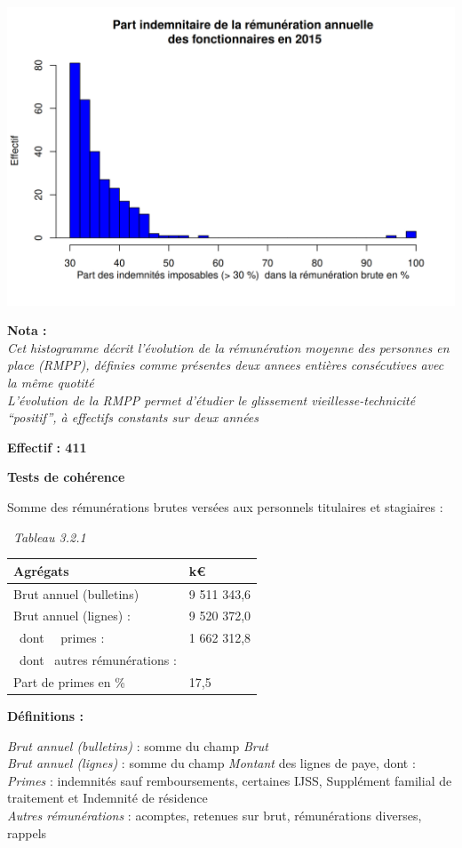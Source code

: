 \includegraphics{altair_files/figure-latex/unnamed-chunk-76-6.png}

\textbf{Nota :}\\
\emph{Cet histogramme décrit l'évolution de la rémunération moyenne des
personnes en place (RMPP), définies comme présentes deux annees entières
consécutives avec la même quotité}\\
\emph{L'évolution de la RMPP permet d'étudier le glissement
vieillesse-technicité ``positif'', à effectifs constants sur deux
années}

\textbf{Effectif : 411 }

\textbf{Tests de cohérence}

Somme des rémunérations brutes versées aux personnels titulaires et
stagiaires :

~\emph{Tableau 3.2.1}

\begin{longtable}[]{@{}ll@{}}
\toprule
Agrégats & k€\tabularnewline
\midrule
\endhead
Brut annuel (bulletins) & 9 511 343,6\tabularnewline
Brut annuel (lignes) : & 9 520 372,0\tabularnewline
~dont ~~primes : & 1 662 312,8\tabularnewline
~dont ~autres rémunérations : &\tabularnewline
Part de primes en \% & 17,5\tabularnewline
\bottomrule
\end{longtable}

\textbf{Définitions :}

\emph{Brut annuel (bulletins)} : somme du champ \emph{Brut}\\
\emph{Brut annuel (lignes)} : somme du champ \emph{Montant} des lignes
de paye, dont :\\
\emph{Primes} : indemnités sauf remboursements, certaines IJSS,
Supplément familial de traitement et Indemnité de résidence\\
\emph{Autres rémunérations} : acomptes, retenues sur brut, rémunérations
diverses, rappels

